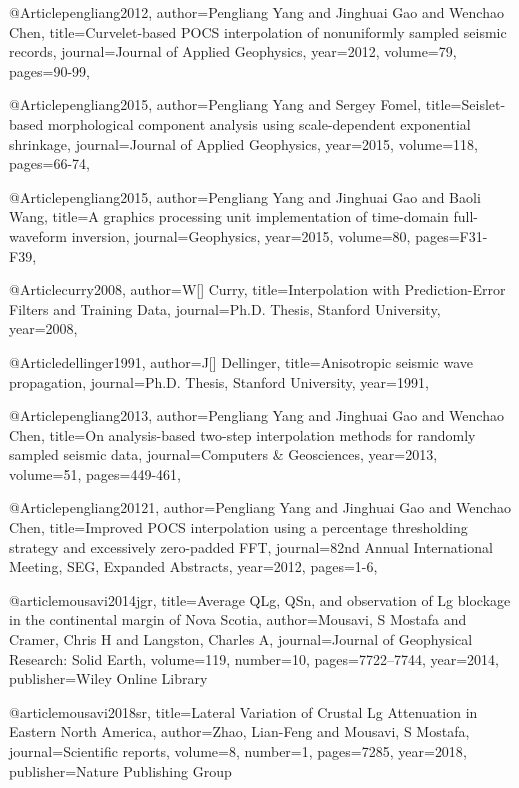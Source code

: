@Article{pengliang2012,
  author={Pengliang Yang and Jinghuai Gao and Wenchao Chen},
  title={Curvelet-based {POCS} interpolation of nonuniformly sampled seismic records},
  journal={Journal of Applied Geophysics},
  year=2012,
  volume=79,
  pages={90-99},
}

@Article{pengliang2015,
  author={Pengliang Yang and Sergey Fomel},
  title={Seislet-based morphological component analysis using scale-dependent exponential shrinkage},
  journal={Journal of Applied Geophysics},
  year=2015,
  volume=118,
  pages={66-74},
}

@Article{pengliang2015,
  author={Pengliang Yang and Jinghuai Gao and Baoli Wang},
  title={A graphics processing unit implementation of time-domain full-waveform inversion},
  journal={Geophysics},
  year=2015,
  volume=80,
  pages={F31-F39},
}

@Article{curry2008,
  author={W[] Curry},
  title={Interpolation with Prediction-Error Filters and Training Data},
  journal={Ph.D. Thesis, Stanford University},
  year=2008,
}

@Article{dellinger1991,
  author={J[] Dellinger},
  title={Anisotropic seismic wave propagation},
  journal={Ph.D. Thesis, Stanford University},
  year=1991,
}

@Article{pengliang2013,
  author={Pengliang Yang and Jinghuai Gao and Wenchao Chen},
  title={On analysis-based two-step interpolation methods for randomly sampled seismic data},
  journal={Computers \& Geosciences},
  year=2013,
  volume=51,
  pages={449-461},
}

@Article{pengliang20121,
  author={Pengliang Yang and Jinghuai Gao and Wenchao Chen},
  title={Improved {POCS} interpolation using a percentage thresholding strategy and excessively zero-padded FFT},
  journal={82nd Annual International Meeting, SEG, Expanded Abstracts},
  year=2012,
  pages={1-6},
}


@article{mousavi2014jgr,
  title={Average QLg, QSn, and observation of Lg blockage in the continental margin of Nova Scotia},
  author={Mousavi, S Mostafa and Cramer, Chris H and Langston, Charles A},
  journal={Journal of Geophysical Research: Solid Earth},
  volume={119},
  number={10},
  pages={7722--7744},
  year={2014},
  publisher={Wiley Online Library}
}

@article{mousavi2018sr,
  title={Lateral Variation of Crustal Lg Attenuation in Eastern North America},
  author={Zhao, Lian-Feng and Mousavi, S Mostafa},
  journal={Scientific reports},
  volume={8},
  number={1},
  pages={7285},
  year={2018},
  publisher={Nature Publishing Group}
}

